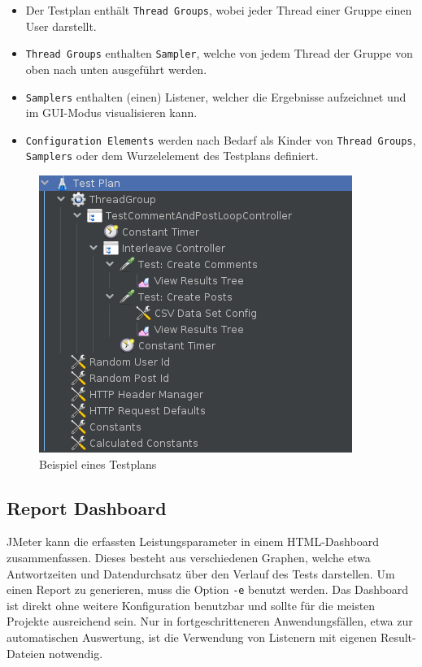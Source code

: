 \begin{itemize}
    \item Der Testplan enthält \texttt{Thread Groups}, wobei jeder Thread einer Gruppe einen User darstellt.
    \item \texttt{Thread Groups} enthalten \texttt{Sampler}, welche von jedem Thread der Gruppe von oben nach unten ausgeführt werden.
    \item \texttt{Samplers} enthalten (einen) Listener, welcher die Ergebnisse aufzeichnet und im GUI-Modus visualisieren kann.
    \item \texttt{Configuration Elements} werden nach Bedarf als Kinder von \texttt{Thread Groups}, 
    \texttt{Samplers} oder dem Wurzelelement des Testplans definiert.   
\end{itemize}

\begin{figure}[h]
    \centering
    \includegraphics[width=0.65\linewidth]{Graphics/Testplan.png}
    \caption{Beispiel eines Testplans}
\end{figure}

\subsection{Report Dashboard}\label{sec:Dashboard}

JMeter kann die erfassten Leistungsparameter in einem HTML-Dashboard zusammenfassen. 
Dieses besteht aus verschiedenen Graphen, welche etwa Antwortzeiten und Datendurchsatz über den Verlauf des Tests darstellen.
Um einen Report zu generieren, muss die Option \texttt{-e} benutzt werden.
Das Dashboard ist direkt ohne weitere Konfiguration benutzbar und sollte für die meisten Projekte ausreichend sein.
Nur in fortgeschritteneren Anwendungsfällen, etwa zur automatischen Auswertung, 
ist die Verwendung von Listenern mit eigenen Result-Dateien notwendig.

